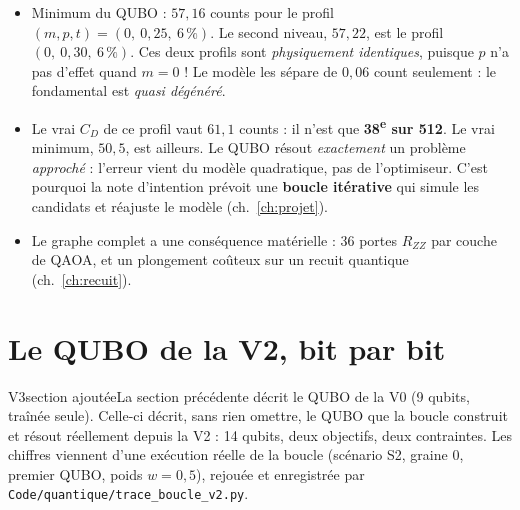 \begin{projet}
\begin{itemize}
\item Minimum du QUBO : $57{,}16$ counts pour le profil $(m,p,t)=(0,\ 0{,}25,\ 6\,\%)$. Le second niveau, $57{,}22$, est le profil $(0,\ 0{,}30,\ 6\,\%)$. Ces deux profils sont \emph{physiquement identiques}, puisque $p$ n'a pas d'effet quand $m=0$ ! Le modèle les sépare de $0{,}06$ count seulement : le fondamental est \emph{quasi dégénéré}.
\item Le vrai $C_D$ de ce profil vaut $61{,}1$ counts : il n'est que \textbf{38\textsuperscript{e} sur 512}. Le vrai minimum, $50{,}5$, est ailleurs. Le QUBO résout \emph{exactement} un problème \emph{approché} : l'erreur vient du modèle quadratique, pas de l'optimiseur. C'est pourquoi la note d'intention prévoit une \textbf{boucle itérative} qui simule les candidats et réajuste le modèle (ch.~\ref{ch:projet}).
\item Le graphe complet a une conséquence matérielle : 36 portes $R_{ZZ}$ par couche de QAOA, et un plongement coûteux sur un recuit quantique (ch.~\ref{ch:recuit}).
\end{itemize}
\end{projet}

\section{Le QUBO de la V2, bit par bit}\label{sec:qubo-v2}
\begin{evolution}{V3}{section ajoutée}La section précédente décrit le QUBO de la V0 (9 qubits, traînée seule). Celle-ci décrit, sans rien omettre, le QUBO que la boucle construit et résout réellement depuis la V2 : 14 qubits, deux objectifs, deux contraintes. Les chiffres viennent d'une exécution réelle de la boucle (scénario S2, graine 0, premier QUBO, poids $w=0{,}5$), rejouée et enregistrée par \texttt{Code/quantique/trace\_boucle\_v2.py}.\end{evolution}

